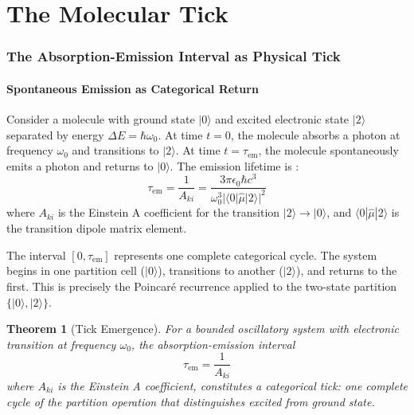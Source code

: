 \documentclass[11pt,twocolumn,a4paper]{article}
\newtheorem{theorem}{Theorem}[section]
\theoremstyle{definition}
\theoremstyle{remark}
\newcommand{\tem}{\tau_{\mathrm{em}}}
\newcommand{\Aki}{A_{ki}}
\begin{document}

\part{The Molecular Tick}

\section{The Absorption-Emission Interval as Physical Tick}
\label{sec:tick}

\subsection{Spontaneous Emission as Categorical Return}

Consider a molecule with ground state $|0\rangle$ and excited electronic state $|2\rangle$ separated by energy $\Delta E = \hbar\omega_0$. At time $t = 0$, the molecule absorbs a photon at frequency $\omega_0$ and transitions to $|2\rangle$. At time $t = \tem$, the molecule spontaneously emits a photon and returns to $|0\rangle$. The emission lifetime is \citep{einstein1917, dirac1928}:
\begin{equation}
\tem = \frac{1}{\Aki} = \frac{3\pi \epsilon_0 \hbar c^3}{\omega_0^3 |\langle 0 | \hat{\mu} | 2 \rangle|^2}
\label{eq:emission_lifetime}
\end{equation}
where $\Aki$ is the Einstein A coefficient for the transition $|2\rangle \to |0\rangle$, and $\langle 0 | \hat{\mu} | 2 \rangle$ is the transition dipole matrix element.

The interval $[0, \tem]$ represents one complete categorical cycle. The system begins in one partition cell ($|0\rangle$), transitions to another ($|2\rangle$), and returns to the first. This is precisely the Poincar\'{e} recurrence applied to the two-state partition $\{|0\rangle, |2\rangle\}$.

\begin{theorem}[Tick Emergence]
\label{thm:tick_emergence}
For a bounded oscillatory system with electronic transition at frequency $\omega_0$, the absorption-emission interval
\begin{equation}
\tem = \frac{1}{\Aki}
\label{eq:tick_period}
\end{equation}
where $\Aki$ is the Einstein A coefficient, constitutes a categorical tick: one complete cycle of the partition operation that distinguishes excited from ground state.
\end{theorem}
\end{document}
